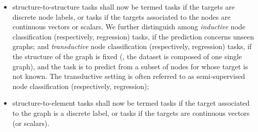 \begin{itemize}
    \item structure-to-structure tasks shall now be termed  tasks if the targets are discrete node labels, or  tasks if the targets associated to the nodes are continuous vectors or scalars. We further distinguish among \emph{inductive} node classification (respectively, regression) tasks, if the prediction concerns unseen graphs; and \emph{transductive} node classification (respectively, regression) tasks, if the structure of the graph is fixed (\ie, the dataset is composed of one single graph), and the task is to predict from a subset of nodes for whose target is not known. The transductive setting is often referred to as semi-supervised node classification (respectively, regression);
    \item structure-to-element tasks shall now be termed  tasks if the target associated to the graph is a discrete label, or  tasks if the targets are continuous vectors (or scalars).
\end{itemize}

